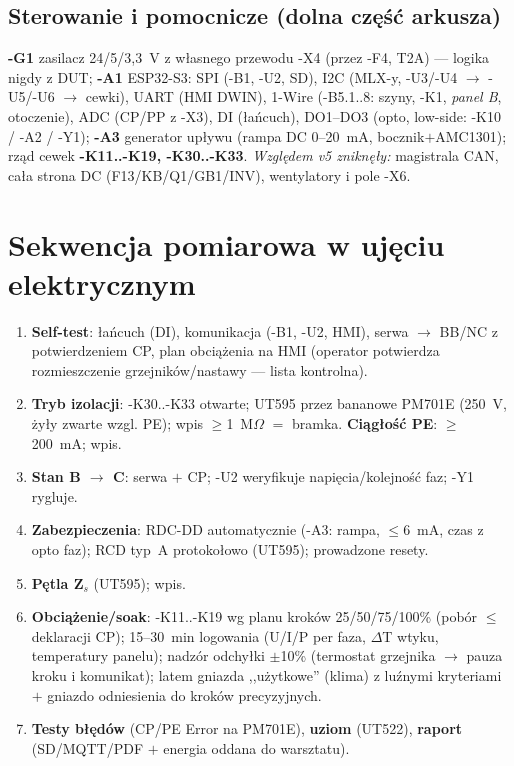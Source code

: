 \documentclass[11pt,a4paper]{article}
\newcommand{\ohm}{$\Omega$}
\begin{document}
\subsection{Sterowanie i pomocnicze (dolna część arkusza)}
\textbf{-G1} zasilacz 24/5/3,3~V z własnego przewodu -X4 (przez -F4, T2A) --- logika nigdy z DUT;
\textbf{-A1} ESP32-S3: SPI (-B1, -U2, SD), I2C (MLX-y, -U3/-U4 $\to$ -U5/-U6 $\to$ cewki), UART
(HMI DWIN), 1-Wire (-B5.1..8: szyny, -K1, \emph{panel B}, otoczenie), ADC (CP/PP z -X3), DI
(łańcuch), DO1--DO3 (opto, low-side: -K10 / -A2 / -Y1); \textbf{-A3} generator upływu (rampa DC
0--20~mA, bocznik$+$AMC1301); rząd cewek \textbf{-K11..-K19, -K30..-K33}. \emph{Względem v5
zniknęły:} magistrala CAN, cała strona DC (F13/KB/Q1/GB1/INV), wentylatory i pole -X6.

\section{Sekwencja pomiarowa w ujęciu elektrycznym}
\begin{enumerate}
\item \textbf{Self-test}: łańcuch (DI), komunikacja (-B1, -U2, HMI), serwa $\to$ BB/NC
z potwierdzeniem CP, plan obciążenia na HMI (operator potwierdza rozmieszczenie
grzejników/nastawy --- lista kontrolna).
\item \textbf{Tryb izolacji}: -K30..-K33 otwarte; UT595 przez bananowe PM701E (250~V, żyły zwarte
wzgl. PE); wpis $\ge$1~M\ohm{} $=$ bramka. \textbf{Ciągłość PE}: $\ge$200~mA; wpis.
\item \textbf{Stan B $\to$ C}: serwa $+$ CP; -U2 weryfikuje napięcia/kolejność faz; -Y1 rygluje.
\item \textbf{Zabezpieczenia}: RDC-DD automatycznie (-A3: rampa, $\le$6~mA, czas z opto faz);
RCD typ~A protokołowo (UT595); prowadzone resety.
\item \textbf{Pętla Z$_s$} (UT595); wpis.
\item \textbf{Obciążenie/soak}: -K11..-K19 wg planu kroków 25/50/75/100\% (pobór $\le$ deklaracji
CP); 15--30~min logowania (U/I/P per faza, $\Delta$T wtyku, temperatury panelu); nadzór odchyłki
$\pm$10\% (termostat grzejnika $\to$ pauza kroku i komunikat); latem gniazda ,,użytkowe'' (klima)
z luźnymi kryteriami $+$ gniazdo odniesienia do kroków precyzyjnych.
\item \textbf{Testy błędów} (CP/PE Error na PM701E), \textbf{uziom} (UT522), \textbf{raport}
(SD/MQTT/PDF $+$ energia oddana do warsztatu).
\end{enumerate}
\end{document}
